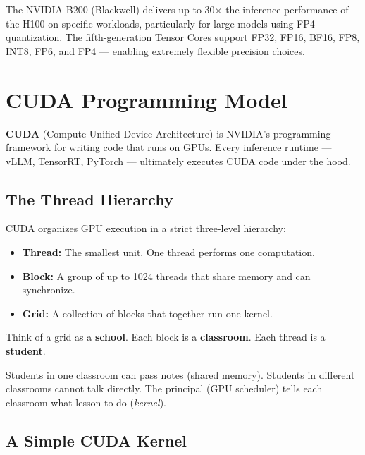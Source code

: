 \documentclass[11pt, twoside, openright]{book}
\newcommand{\notebox}[2]{\begin{tcolorbox}[notestyle, title={#1}]#2\end{tcolorbox}}
\newcommand{\analogybox}[2]{\begin{tcolorbox}[analogystyle, title={Analogy: #1}]#2\end{tcolorbox}}
\newcommand{\keyterm}[1]{\textbf{\color{AccentOrange}#1}}
\begin{document}
\notebox{Blackwell's Leap}{
The NVIDIA B200 (Blackwell) delivers up to 30$\times$ the inference performance
of the H100 on specific workloads, particularly for large models using FP4
quantization.  The fifth-generation Tensor Cores support FP32, FP16, BF16, FP8,
INT8, FP6, and FP4 --- enabling extremely flexible precision choices.
}

\section{CUDA Programming Model}

\keyterm{CUDA} (Compute Unified Device Architecture) is NVIDIA's programming
framework for writing code that runs on GPUs.  Every inference runtime ---
vLLM, TensorRT, PyTorch --- ultimately executes CUDA code under the hood.

\subsection{The Thread Hierarchy}

CUDA organizes GPU execution in a strict three-level hierarchy:

\begin{itemize}
  \item \textbf{Thread:} The smallest unit.  One thread performs one computation.
  \item \textbf{Block:} A group of up to 1024 threads that share memory and can synchronize.
  \item \textbf{Grid:} A collection of blocks that together run one kernel.
\end{itemize}

\analogybox{School Analogy}{
Think of a grid as a \textbf{school}.
Each block is a \textbf{classroom}.
Each thread is a \textbf{student}.

Students in one classroom can pass notes (shared memory).
Students in different classrooms cannot talk directly.
The principal (GPU scheduler) tells each classroom what lesson to do (\textit{kernel}).
}

\subsection{A Simple CUDA Kernel}
\end{document}
